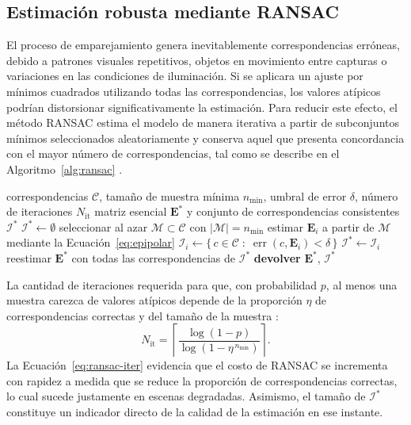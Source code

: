 \subsection{Estimación robusta mediante RANSAC}

El proceso de emparejamiento genera inevitablemente correspondencias erróneas, debido a patrones visuales repetitivos, objetos en movimiento entre capturas o variaciones en las condiciones de iluminación.
Si se aplicara un ajuste por mínimos cuadrados utilizando todas las correspondencias, los valores atípicos podrían distorsionar significativamente la estimación.
Para reducir este efecto, el método RANSAC estima el modelo de manera iterativa a partir de subconjuntos mínimos seleccionados aleatoriamente y conserva aquel que presenta concordancia con el mayor número de correspondencias, tal como se describe en el Algoritmo~\ref{alg:ransac} \cite{fischler1981ransac}.

\begin{algorithm}[H]
\caption[RANSAC]{RANSAC aplicado a la estimación de la matriz esencial. Fuente: elaboración propia con base en~\cite{fischler1981ransac,hartley2003mvg}.}
\label{alg:ransac}
\begin{algorithmic}[1]
\REQUIRE correspondencias $\mathcal{C}$, tamaño de muestra mínima $n_{\min}$, umbral de error $\delta$, número de iteraciones $N_{\mathrm{it}}$
\ENSURE matriz esencial $\mathbf{E}^{*}$ y conjunto de correspondencias consistentes $\mathcal{I}^{*}$
\STATE $\mathcal{I}^{*} \leftarrow \emptyset$
  \STATE seleccionar al azar $\mathcal{M} \subset \mathcal{C}$ con $|\mathcal{M}| = n_{\min}$
  \STATE estimar $\mathbf{E}_i$ a partir de $\mathcal{M}$ mediante la Ecuación~\eqref{eq:epipolar}
  \STATE $\mathcal{I}_i \leftarrow \{\, c \in \mathcal{C} \;:\; \operatorname{err}(c,\mathbf{E}_i) < \delta \,\}$
    \STATE $\mathcal{I}^{*} \leftarrow \mathcal{I}_i$
  \ENDIF
\ENDFOR
\STATE reestimar $\mathbf{E}^{*}$ con todas las correspondencias de $\mathcal{I}^{*}$
\STATE \textbf{devolver} $\mathbf{E}^{*}$, $\mathcal{I}^{*}$
\end{algorithmic}
\end{algorithm}

La cantidad de iteraciones requerida para que, con probabilidad $p$, al menos una muestra carezca de valores atípicos depende de la proporción $\eta$ de correspondencias correctas y del tamaño de la muestra \cite{hartley2003mvg}:
\begin{equation}
N_{\mathrm{it}} = \left\lceil \frac{\log(1-p)}{\log\!\left(1-\eta^{\,n_{\min}}\right)} \right\rceil .
\label{eq:ransac-iter}
\end{equation}
La Ecuación~\eqref{eq:ransac-iter} evidencia que el costo de RANSAC se incrementa con rapidez a medida que se reduce la proporción de correspondencias correctas, lo cual sucede justamente en escenas degradadas.
Asimismo, el tamaño de $\mathcal{I}^{*}$ constituye un indicador directo de la calidad de la estimación en ese instante.

